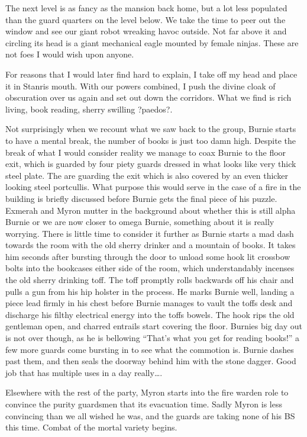The next level is as fancy as the mansion back home, but a lot less populated than the guard quarters on the level below. We take the time to peer out the window and see our giant robot wreaking havoc outside. Not far above it and circling its head is a giant mechanical eagle mounted by female ninjas. These are not foes I would wish upon anyone.\medskip

For reasons that I would later find hard to explain, I take off my head and place it in Stanris mouth. With our powers combined, I push the divine cloak of obscuration over us again and set out down the corridors. What we find is rich living, book reading, sherry swilling ?paedos?.\medskip

Not surprisingly when we recount what we saw back to the group, Burnie starts to have a mental break, the number of books is just too damn high. Despite the break of what I would consider reality we manage to coax Burnie to the floor exit, which is guarded by four piety guards dressed in what looks like very thick steel plate. The are guarding the exit which is also covered by an even thicker looking steel portcullis. What purpose this would serve in the case of a fire in the building is briefly discussed before Burnie gets the final piece of his puzzle. Exmerah and Myron mutter in the background about whether this is still alpha Burnie or we are now closer to omega Burnie, something about it is really worrying. There is little time to consider it further as Burnie starts a mad dash towards the room with the old sherry drinker and a mountain of books. It takes him seconds after bursting through the door to unload some hook lit crossbow bolts into the bookcases either side of the room, which understandably incenses the old sherry drinking toff. The toff promptly rolls backwards off his chair and pulls a gun from his hip holster in the process. He marks Burnie well, landing a piece lead firmly in his chest before Burnie manages to vault the toffs desk and discharge his filthy electrical energy into the toffs bowels. The hook rips the old gentleman open, and charred entrails start covering the floor. Burnies big day out is not over though, as he is bellowing “That’s what you get for reading books!” a few more guards come bursting in to see what the commotion is. Burnie dashes past them, and then seals the doorway behind him with the stone dagger. Good job that has multiple uses in a day really….\medskip

Elsewhere with the rest of the party, Myron starts into the fire warden role to convince the purity guardsmen that its evacuation time. Sadly Myron is less convincing than we all wished he was, and the guards are taking none of his BS this time. Combat of the mortal variety begins.\medskip


